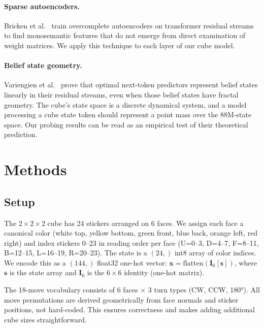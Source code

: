\documentclass[12pt]{article}
\begin{document}
\paragraph{Sparse autoencoders.}
Bricken et al.\ \cite{bricken2023monosemantic} train overcomplete autoencoders
on transformer residual streams to find monosemantic features that do not emerge
from direct examination of weight matrices.  We apply this technique to each
layer of our cube model.

\paragraph{Belief state geometry.}
Variengien et al.\ \cite{variengien2024beliefstate} prove that optimal
next-token predictors represent belief states linearly in their residual streams,
even when those belief states have fractal geometry.  The cube's state space is a
discrete dynamical system, and a model processing a cube state token should
represent a point mass over the 88M-state space.  Our probing results can
be read as an empirical test of their theoretical prediction.

\section{Methods}

\subsection{Setup}

The $2{\times}2{\times}2$ cube has 24 stickers arranged on 6 faces.  We assign each
face a canonical color (white top, yellow bottom, green front, blue back, orange
left, red right) and index stickers 0--23 in reading order per face (U=0--3,
D=4--7, F=8--11, B=12--15, L=16--19, R=20--23).  The state is a
$(24,)$ int8 array of color indices.  We encode this as a $(144,)$ float32
one-hot vector: $\mathbf{x} = \text{flatten}(\mathbf{I}_6[\mathbf{s}])$, where
$\mathbf{s}$ is the state array and $\mathbf{I}_6$ is the $6 \times 6$ identity
(one-hot matrix).

The 18-move vocabulary consists of 6 faces $\times$ 3 turn types (CW, CCW,
180°).  All move permutations are derived geometrically from face normals and
sticker positions, not hard-coded.  This ensures correctness and makes adding
additional cube sizes straightforward.
\end{document}
